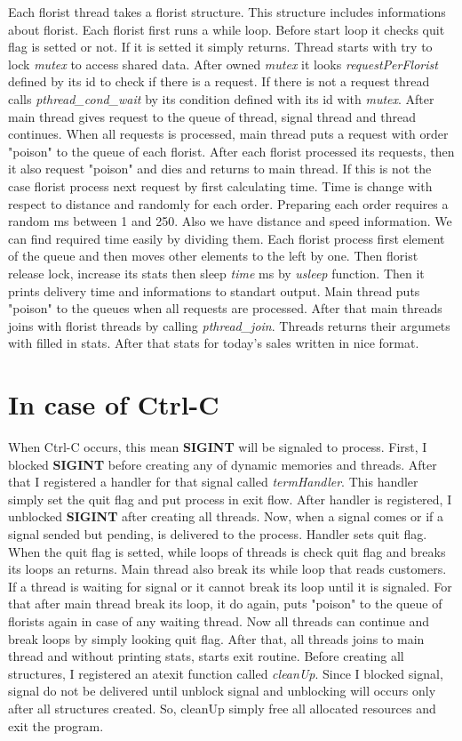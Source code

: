\documentclass[twocolumn]{article}
\begin{document}
Each florist thread takes a florist structure. This structure includes informations about florist. Each florist first runs a while loop. Before start loop it checks quit flag is setted or not. If it is setted it simply returns. Thread starts with try to lock \textit{mutex} to access shared data. After owned \textit{mutex} it looks \textit{requestPerFlorist} defined by its id to check if there is a request. If there is not a request thread calls \textit{pthread\_cond\_wait} by its condition defined with its id with \textit{mutex}. After main thread gives request to the queue of thread, signal thread and thread continues. When all requests is processed, main thread puts a request with order "poison" to the queue of each florist. After each florist processed its requests, then it also request "poison" and dies and returns to main thread. If this is not the case florist process next request by first calculating time. Time is change with respect to distance and randomly for each order. Preparing each order requires a random ms between 1 and 250. Also we have distance and speed information. We can find required time easily by dividing them. Each florist process first element of the queue and then moves other elements to the left by one. Then florist release lock, increase its stats then sleep \textit{time} ms by \textit{usleep} function. Then it prints delivery time and informations to standart output. Main thread puts "poison" to the queues when all requests are processed. After that main threads joins with florist threads by calling \textit{pthread\_join}. Threads returns their argumets with filled in stats. After that stats for today's sales written in nice format.

\section{In case of Ctrl-C}

When Ctrl-C occurs, this mean \textbf{SIGINT} will be signaled to process. First, I blocked \textbf{SIGINT} before creating any of dynamic memories and threads. After that I registered a handler for that signal called \textit{termHandler}. This handler simply set the quit flag and put process in exit flow. After handler is registered, I unblocked \textbf{SIGINT} after creating all threads. Now, when a signal comes or if a signal sended but pending, is delivered to the process. Handler sets quit flag. When the quit flag is setted, while loops of threads is check quit flag and breaks its loops an returns. Main thread also break its while loop that reads customers. If a thread is waiting for signal or it cannot break its loop until it is signaled. For that after main thread break its loop, it do again, puts "poison" to the queue of florists again in case of any waiting thread. Now all threads can continue and break loops by simply looking quit flag. After that, all threads joins to main thread and without printing stats, starts exit routine. Before creating all structures, I registered an atexit function called \textit{cleanUp}. Since I blocked signal, signal do not be delivered until unblock signal and unblocking will occurs only after all structures created. So, cleanUp simply free all allocated resources and exit the program.
\end{document}
